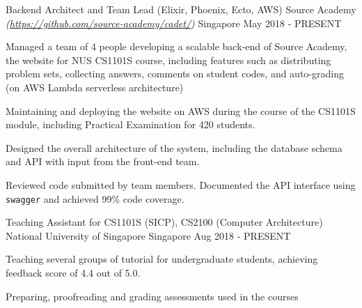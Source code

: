 \begin{cventries}
  \cventry
  {Backend Architect and Team Lead (Elixir, Phoenix, Ecto, AWS)} %
  {Source Academy \textmd{\em\tiny(\url{https://github.com/source-academy/cadet/})}} %
  {Singapore} %
  {May 2018 - PRESENT} %
  {
    \begin{cvitems}
      \item {Managed a team of 4 people developing a scalable back-end of Source Academy, the website for NUS CS1101S course, including features such as distributing problem sets, collecting answers, comments on student codes, and auto-grading (on AWS Lambda serverless architecture)}
      \item {Maintaining and deploying the website on AWS during the course of the CS1101S module, including Practical Examination for 420 students.}
      \item {Designed the overall architecture of the system, including the database schema and API with input from the front-end team.}
      \item {Reviewed code submitted by team members. Documented the API interface using \texttt{swagger} and achieved 99\% code coverage.}
    \end{cvitems}
  }
  \cventry
  {Teaching Assistant for CS1101S (SICP), CS2100 (Computer Architecture)} %
  {National University of Singapore} %
  {Singapore} %
  {Aug 2018 - PRESENT} %
  {
    \begin{cvitems}
      \item {Teaching several groups of tutorial for undergraduate students, achieving feedback score of 4.4 out of 5.0.}
      \item {Preparing, proofreading and grading assessments used in the courses}
    \end{cvitems}
  }

\end{cventries}
